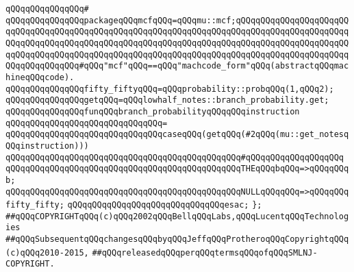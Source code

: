 \verb|qQQqqQQqqQQqqQQq#|\newline
\verb|qQQqqQQqqQQqqQQqpackageqQQqmcfqQQq=qQQqmu::mcf;qQQqqQQqqQQqqQQqqQQqqQQqqQQqqQQqqQQqqQQqqQQqqQQqqQQqqQQqqQQqqQQqqQQqqQQqqQQqqQQqqQQqqQQqqQQqqQQqqQQqqQQqqQQqqQQqqQQqqQQqqQQqqQQqqQQqqQQqqQQqqQQqqQQqqQQqqQQqqQQqqQQqqQQqqQQqqQQqqQQqqQQqqQQqqQQqqQQqqQQqqQQqqQQqqQQqqQQqqQQqqQQqqQQqqQQqqQQqqQQqqQQqqQQq#qQQq"mcf"qQQq==qQQq"machcode_form"qQQq(abstractqQQqmachineqQQqcode).|\newline
\newline
\verb|qQQqqQQqqQQqqQQqfifty_fiftyqQQq=qQQqprobability::probqQQq(1,qQQq2);|\newline
\newline
\verb|qQQqqQQqqQQqqQQqgetqQQq=qQQqlowhalf_notes::branch_probability.get;|\newline
\newline
\newline
\verb|qQQqqQQqqQQqqQQqfunqQQqbranch_probabilityqQQqqQQqinstruction|\newline
\verb|qQQqqQQqqQQqqQQqqQQqqQQqqQQqqQQq=|\newline
\verb|qQQqqQQqqQQqqQQqqQQqqQQqqQQqqQQqcaseqQQq(getqQQq(#2qQQq(mu::get_notesqQQqinstruction)))|\newline
\verb|qQQqqQQqqQQqqQQqqQQqqQQqqQQqqQQqqQQqqQQqqQQqqQQq#qQQqqQQqqQQqqQQqqQQq|\newline
\verb|qQQqqQQqqQQqqQQqqQQqqQQqqQQqqQQqqQQqqQQqqQQqqQQqTHEqQQqbqQQq=>qQQqqQQqb;|\newline
\verb|qQQqqQQqqQQqqQQqqQQqqQQqqQQqqQQqqQQqqQQqqQQqqQQqNULLqQQqqQQq=>qQQqqQQqfifty_fifty;|\newline
\verb|qQQqqQQqqQQqqQQqqQQqqQQqqQQqqQQqesac;|\newline
\verb|};|\newline
\newline
\newline
\verb|##qQQqCOPYRIGHTqQQq(c)qQQq2002qQQqBellqQQqLabs,qQQqLucentqQQqTechnologies|\newline
\verb|##qQQqSubsequentqQQqchangesqQQqbyqQQqJeffqQQqProtheroqQQqCopyrightqQQq(c)qQQq2010-2015,|\newline
\verb|##qQQqreleasedqQQqperqQQqtermsqQQqofqQQqSMLNJ-COPYRIGHT.|\newline

